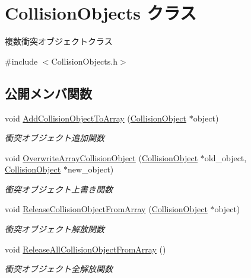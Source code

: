 \hypertarget{class_collision_objects}{}\section{Collision\+Objects クラス}
\label{class_collision_objects}


複数衝突オブジェクトクラス  




{\ttfamily \#include $<$Collision\+Objects.\+h$>$}

\subsection*{公開メンバ関数}
\begin{DoxyCompactItemize}
\item 
void \mbox{\hyperlink{class_collision_objects_a50d6593f98cd04e23ad7ea9102eccc3c}{Add\+Collision\+Object\+To\+Array}} (\mbox{\hyperlink{class_collision_object}{Collision\+Object}} $\ast$object)
\begin{DoxyCompactList}\small\item\em 衝突オブジェクト追加関数 \end{DoxyCompactList}\item 
void \mbox{\hyperlink{class_collision_objects_aed8d6903485ae775d8bbff511796a653}{Overwrite\+Array\+Collision\+Object}} (\mbox{\hyperlink{class_collision_object}{Collision\+Object}} $\ast$old\+\_\+object, \mbox{\hyperlink{class_collision_object}{Collision\+Object}} $\ast$new\+\_\+object)
\begin{DoxyCompactList}\small\item\em 衝突オブジェクト上書き関数 \end{DoxyCompactList}\item 
void \mbox{\hyperlink{class_collision_objects_a38bfe55a93549c90d416c0d1d560932b}{Release\+Collision\+Object\+From\+Array}} (\mbox{\hyperlink{class_collision_object}{Collision\+Object}} $\ast$object)
\begin{DoxyCompactList}\small\item\em 衝突オブジェクト解放関数 \end{DoxyCompactList}\item 
void \mbox{\hyperlink{class_collision_objects_a2efe32f283fe9b2a30ff8d1e370f152d}{Release\+All\+Collision\+Object\+From\+Array}} ()
\begin{DoxyCompactList}\small\item\em 衝突オブジェクト全解放関数 \end{DoxyCompactList}\item 

\end{DoxyCompactItemize}
